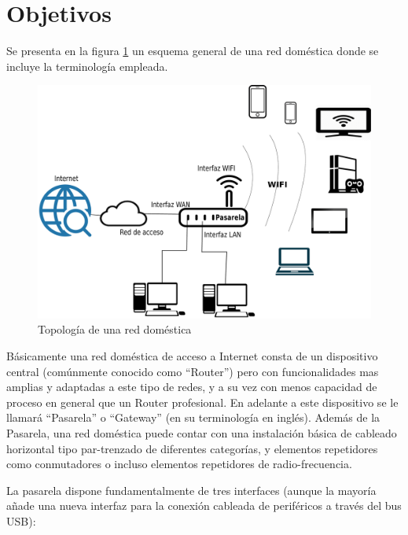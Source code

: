 \documentclass[12pt]{article}
\begin{document}
\section{Objetivos} \label{sec:obj}
    Se presenta en la figura \ref{fig:red_soho} un esquema general de una red doméstica donde se incluye la terminología empleada.

    \begin{figure}[hp]
    \centering
        \includegraphics[scale=0.2]{soho_network.eps}
        \caption{Topología de una red doméstica}
        \label{fig:red_soho}
    \end{figure}

    Básicamente una red doméstica de acceso a Internet consta de un dispositivo central (comúnmente conocido como ``Router'') pero con funcionalidades mas amplias y adaptadas a este tipo de redes, y a su vez con menos capacidad de proceso en general que un Router profesional. En adelante a este dispositivo se le llamará ``Pasarela'' o ``Gateway'' (en su terminología en inglés). Además de la Pasarela, una red doméstica puede contar con una instalación básica de cableado horizontal tipo par-trenzado de diferentes categorías, y elementos repetidores como conmutadores o incluso elementos repetidores de radio-frecuencia.

    La pasarela dispone fundamentalmente de tres interfaces (aunque la mayoría añade una nueva interfaz para la conexión cableada de periféricos a través del bus USB): 
\end{document}

